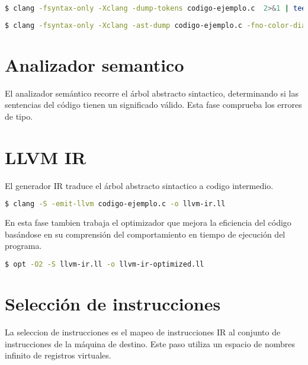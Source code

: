 \begin{lstlisting}[label=comandoC, caption= Comando de compilación para obtener tokens \cite{repositorio} para CLANG/LLVM., language=bash]
    $ clang -fsyntax-only -Xclang -dump-tokens codigo-ejemplo.c  2>&1 | tee tokens  \end{lstlisting}

\begin{lstlisting}[label=comandoC, caption= Comando de compilación para obtener ast \cite{repositorio} para CLANG/LLVM., language=bash]
    $ clang -fsyntax-only -Xclang -ast-dump codigo-ejemplo.c -fno-color-diagnostics > ast \end{lstlisting}

\section{Analizador semantico}
El analizador semántico recorre el árbol abstracto sintactico, 
determinando si las sentencias del código tienen un significado válido. 
Esta fase comprueba los errores de tipo.

\section{LLVM IR}
El generador IR traduce el árbol abstracto sintactico a codigo intermedio. 

\begin{lstlisting}[label=comandoC, caption= Comando de compilación para obtener llvm-ir.ll \cite{repositorio} para CLANG/LLVM., language=bash]
    $ clang -S -emit-llvm codigo-ejemplo.c -o llvm-ir.ll \end{lstlisting}

En esta fase tambien trabaja el optimizador que mejora la eficiencia del código basándose 
en su comprensión del comportamiento en tiempo de ejecución del programa. 

\begin{lstlisting}[label=comandoC, caption= Comando de compilación para obtener llvm-ir-optimizedd.ll \cite{repositorio} para CLANG/LLVM., language=bash]
    $ opt -O2 -S llvm-ir.ll -o llvm-ir-optimized.ll \end{lstlisting}

\section{Selección de instrucciones} 

La seleccion de instrucciones es el mapeo de instrucciones IR al conjunto 
de instrucciones de la máquina de destino. Este paso utiliza un espacio de 
nombres infinito de registros virtuales.

